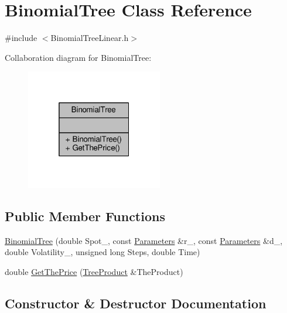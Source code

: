 \hypertarget{classBinomialTree}{}\section{Binomial\+Tree Class Reference}
\label{classBinomialTree}


{\ttfamily \#include $<$Binomial\+Tree\+Linear.\+h$>$}



Collaboration diagram for Binomial\+Tree\+:
\nopagebreak
\begin{figure}[H]
\begin{center}
\leavevmode
\includegraphics[width=169pt]{classBinomialTree__coll__graph}
\end{center}
\end{figure}
\subsection*{Public Member Functions}
\begin{DoxyCompactItemize}
\item 
\hyperlink{classBinomialTree_a2eb5a7209e8d41936ae4b00a007b7641}{Binomial\+Tree} (double Spot\+\_\+, const \hyperlink{classParameters}{Parameters} \&r\+\_\+, const \hyperlink{classParameters}{Parameters} \&d\+\_\+, double Volatility\+\_\+, unsigned long Steps, double Time)
\item 
double \hyperlink{classBinomialTree_a07abae93043bcd34d7144913b2290b03}{Get\+The\+Price} (\hyperlink{classTreeProduct}{Tree\+Product} \&The\+Product)
\end{DoxyCompactItemize}


\subsection{Constructor \& Destructor Documentation}
\hypertarget{classBinomialTree_a2eb5a7209e8d41936ae4b00a007b7641}{}\label{classBinomialTree_a2eb5a7209e8d41936ae4b00a007b7641} 
